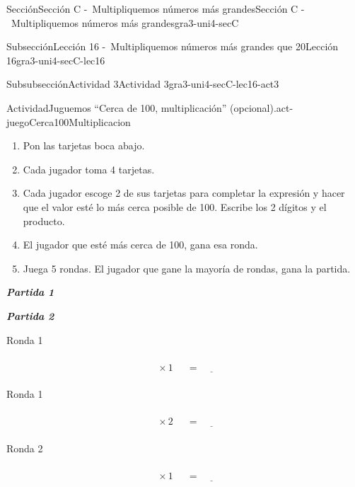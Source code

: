 \documentclass[twoside,10pt,]{article}
\newcommand{\alert}[1]{\textbf{\textit{#1}}}
\begin{document}
\begin{sectionptx}{Sección}{Sección C -~Multipliquemos números más grandes}{}{Sección C -~Multipliquemos números más grandes}{}{}{gra3-uni4-secC}
\begin{subsectionptx}{Subsección}{Lección 16 -~Multipliquemos números más grandes que 20}{}{Lección 16}{}{}{gra3-uni4-secC-lec16}
\begin{subsubsectionptx}{Subsubsección}{Actividad 3}{}{Actividad 3}{}{}{gra3-uni4-secC-lec16-act3}
\begin{activity}{Actividad}{Juguemos “Cerca de 100, multiplicación” (opcional).}{act-juegoCerca100Multiplicacion}
\begin{sidebyside}{2}{0.05}{0.05}{0.1}
\end{sidebyside}%
%
\begin{enumerate}
\item{}Pon las tarjetas boca abajo.%
\item{}Cada jugador toma 4 tarjetas.%
\item{}Cada jugador escoge 2 de sus tarjetas para completar la expresión y hacer que el valor esté lo más cerca posible de 100. Escribe los 2 dígitos y el producto.%
\item{}El jugador que esté más cerca de 100, gana esa ronda.%
\item{}Juega 5 rondas. El jugador que gane la mayoría de rondas, gana la partida.%
\end{enumerate}
\begin{sidebyside}{2}{0}{0}{0.1}%
\begin{sbspanel}{0.45}%
\alert{Partida 1}%
\end{sbspanel}%
\begin{sbspanel}{0.45}%
\par
\alert{Partida 2}%
\end{sbspanel}%
\end{sidebyside}%
\begin{sidebyside}{2}{0}{0}{0.1}%
\begin{sbspanel}{0.45}%
Ronda 1%
\par
%
\begin{equation*}
\boxed{\phantom{\frac{00}{00}}} \times 1 \ \boxed{\phantom{\frac{00}{00}}}= \underline{\hspace{1cm}}
\end{equation*}
%
\end{sbspanel}%
\begin{sbspanel}{0.45}%
Ronda 1%
\par
%
\begin{equation*}
\boxed{\phantom{\frac{00}{00}}} \times 2 \ \boxed{\phantom{\frac{00}{00}}}= \underline{\hspace{1cm}}
\end{equation*}
%
\end{sbspanel}%
\end{sidebyside}%
\begin{sidebyside}{2}{0}{0}{0.1}%
\begin{sbspanel}{0.45}%
Ronda 2%
\par
%
\begin{equation*}
\boxed{\phantom{\frac{00}{00}}} \times 1 \ \boxed{\phantom{\frac{00}{00}}}= \underline{\hspace{1cm}}

\end{equation*}
\end{sbspanel}
\end{sidebyside}
\end{activity}
\end{subsubsectionptx}
\end{subsectionptx}
\end{sectionptx}
\end{document}
